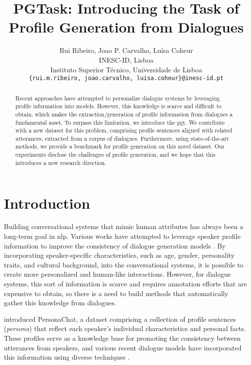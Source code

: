 \documentclass[11pt]{article}
\title{PGTask: Introducing the Task of Profile Generation from Dialogues}
\author{Rui Ribeiro, Joao P. Carvalho, Luísa Coheur\\
  INESC-ID, Lisboa\\
  Instituto Superior Técnico, Universidade de Lisboa \\
  \texttt{\{rui.m.ribeiro, joao.carvalho, luisa.coheur\}@inesc-id.pt} \\}
\begin{document}
\maketitle

\begin{abstract}
Recent approaches have attempted to personalize dialogue systems by leveraging profile information into models. However, this knowledge is scarce and difficult to obtain, which makes the extraction/generation of profile information from dialogues a fundamental asset. To surpass this limitation, we introduce the \gls*{pgt}. We contribute with a new dataset for this problem, comprising profile sentences aligned with related utterances, extracted from a corpus of dialogues. Furthermore, using state-of-the-art methods, we provide a benchmark for profile generation on this novel dataset. Our experiments disclose the challenges of profile generation, and we hope that this introduces a new research direction.
\end{abstract}

\section{Introduction}

Building conversational systems that mimic human attributes has always been a long-term goal in \gls*{nlp}. 
Various works have attempted to leverage speaker profile information to improve the consistency of dialogue generation models \cite{EXPLOIT-PERSONA, LONG-TERM, DATA-MANIPULATION-PERSONA}. 
By incorporating speaker-specific characteristics, such as age, gender, personality traits, and cultural background, into the conversational systems, it is possible to create more personalized and human-like interactions.
However, for dialogue systems, this sort of information is scarce and requires annotation efforts that are expensive to obtain, so there is a need to build methods that automatically gather this knowledge from dialogues.

\citet{PERSONACHAT} introduced PersonaChat, a dataset comprising a collection of profile sentences (\textit{persona}) that reflect each speaker's individual characteristics and personal facts. These profiles serve as a knowledge base for promoting the consistency between utterances from speakers, and various recent dialogue models have incorporated this information using diverse techniques \cite{GENERATE-DELETE-REWRITE, BERTOVERBERT, DATA-MANIPULATION-PERSONA}.
\end{document}
